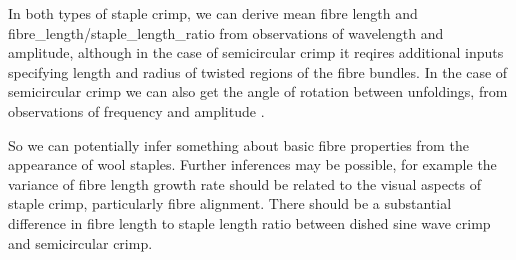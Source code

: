 \documentclass[titlepage,10pt]{article}  %
\begin{document}
In both types of staple crimp, we can derive mean fibre length and fibre\_length/staple\_length\_ratio from observations of wavelength and amplitude, although in the case of semicircular crimp it reqires additional inputs specifying length and radius of twisted regions of the fibre bundles. In the case of semicircular crimp we can also get the angle of rotation between unfoldings, from observations of frequency  and amplitude .

So we can potentially infer something about basic fibre properties from the appearance of wool staples. Further inferences may be possible, for example the variance of fibre length growth rate should be related to the visual aspects of staple crimp, particularly fibre alignment. There should be a substantial difference in fibre length to staple length ratio between dished sine wave crimp and semicircular crimp.
\end{document}
